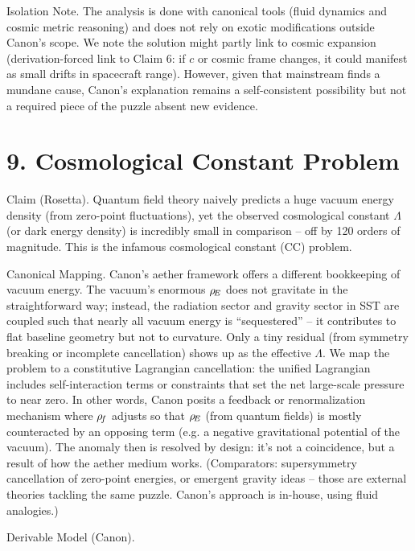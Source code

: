 \documentclass[11pt]{article}
\begin{document}
Isolation Note. The analysis is done with canonical tools (fluid dynamics and cosmic metric reasoning) and does not rely on exotic modifications outside Canon’s scope. We note the solution might partly link to cosmic expansion (derivation-forced link to Claim 6: if $c$ or cosmic frame changes, it could manifest as small drifts in spacecraft range). However, given that mainstream finds a mundane cause, Canon’s explanation remains a self-consistent possibility but not a required piece of the puzzle absent new evidence.


\section*{9. Cosmological Constant Problem}

Claim (Rosetta). Quantum field theory naively predicts a huge vacuum energy density (from zero-point fluctuations), yet the observed cosmological constant $\Lambda$ (or dark energy density) is incredibly small in comparison – off by 120 orders of magnitude. This is the infamous cosmological constant (CC) problem.


Canonical Mapping. Canon’s aether framework offers a different bookkeeping of vacuum energy. The vacuum’s enormous $\rho_{\!E}$ does not gravitate in the straightforward way; instead, the radiation sector and gravity sector in SST are coupled such that nearly all vacuum energy is “sequestered” – it contributes to flat baseline geometry but not to curvature. Only a tiny residual (from symmetry breaking or incomplete cancellation) shows up as the effective $\Lambda$. We map the problem to a constitutive Lagrangian cancellation: the unified Lagrangian includes self-interaction terms or constraints that set the net large-scale pressure to near zero. In other words, Canon posits a feedback or renormalization mechanism where $\rho_{\!f}$ adjusts so that $\rho_{\!E}$ (from quantum fields) is mostly counteracted by an opposing term (e.g. a negative gravitational potential of the vacuum). The anomaly then is resolved by design: it’s not a coincidence, but a result of how the aether medium works. (Comparators: supersymmetry cancellation of zero-point energies, or emergent gravity ideas – those are external theories tackling the same puzzle. Canon’s approach is in-house, using fluid analogies.)


Derivable Model (Canon).
\end{document}
